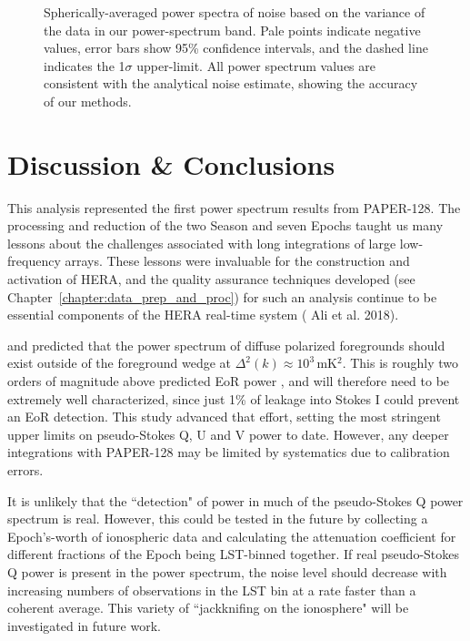 \begin{figure}
\begin{tabular}{ll}
\end{tabular}
\caption[Spherically-averaged noise power spectra.]{Spherically-averaged power spectra of noise based on the variance of the data in our power-spectrum band. Pale points indicate negative values, error bars show 95\% confidence intervals, and the dashed line indicates the 1$\sigma$ upper-limit. All power spectrum values are consistent with the analytical noise estimate, showing the accuracy of our methods.}
\label{fig:psa128_power_spectra_noise}
\end{figure}

\section{Discussion \& Conclusions}
\label{sec:psa128_conc}

This analysis represented the first power spectrum results from PAPER-128. The processing and reduction of the two Season and seven Epochs taught us many lessons about the challenges associated with long integrations of large low-frequency arrays. These lessons were invaluable for the construction and activation of HERA, and the quality assurance techniques developed (see Chapter~\ref{chapter:data_prep_and_proc}) for such an analysis continue to be essential components of the HERA real-time system ({\color{red} Ali et al. 2018}).

\cite{Nunhokee.17} and \cite{Asad.15} predicted that the power spectrum of diffuse polarized foregrounds should exist outside of the foreground wedge at $\Delta^2(k)\approx10^3$\,mK$^2$. This is roughly two orders of magnitude above predicted EoR power \citep{Lidz.07}, and will therefore need to be extremely well characterized, since just 1\% of leakage into Stokes I could prevent an EoR detection. This study advanced that effort, setting the most stringent upper limits on pseudo-Stokes Q, U and V power to date. However, any deeper integrations with PAPER-128 may be limited by systematics due to calibration errors. 

It is unlikely that the ``detection" of power in much of the pseudo-Stokes Q power spectrum is real. However, this could be tested in the future by collecting a Epoch's-worth of ionospheric data and calculating the attenuation coefficient for different fractions of the Epoch being LST-binned together. If real pseudo-Stokes Q power is present in the power spectrum, the noise level should decrease with increasing numbers of observations in the LST bin at a rate faster than a coherent average. This variety of ``jackknifing on the ionosphere" will be investigated in future work.